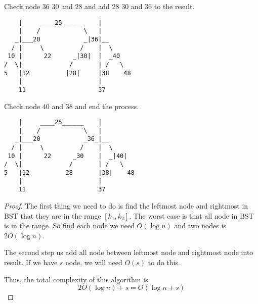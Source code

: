 \documentclass{article}
\begin{document}
Check node $36$ $30$ and $28$ and add $28$ $30$ and $36$ to the result.
\begin{lstlisting}
    |     ____25______    |
    |    /            \   |
   _|___20            _|36|__
  / |     \          /    |  \
 10 |      22      _|30|  |  _40
/  \|             /       | /   \
5   |12          |28|     |38    48
    |                     |
    11                    37
\end{lstlisting}
\newpage
Check node $40$ and $38$ and end the process.
\begin{lstlisting}
    |     ____25______    |
    |    /            \   |
   _|___20            _36_|__
  / |     \          /    |  \
 10 |      22      _30    |  _|40|
/  \|             /       | /   \
5   |12          28       |38|    48
    |                     |
    11                    37
\end{lstlisting}
\begin{proof}
    The first thing we need to do is find the leftmost node and rightmost in BST that they are in the range $[k_1,k_2]$. The worst case is that all node in BST is in the range. So find each node we need $O(\log n)$ and two nodes is $2O(\log n)$.

    The second step us add all node between leftmost node and rightmost node into result. If we have $s$ node, we will need $O(s)$ to do this.

    Thus, the total complexity of this algorithm is $$2O(\log n)+s=O(\log n+s)$$

\end{proof}
\end{document}
